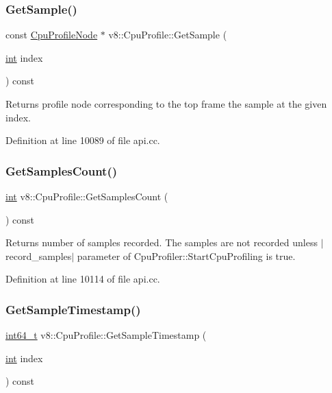 \subsubsection{\texorpdfstring{Get\+Sample()}{GetSample()}}
{\footnotesize\ttfamily const \mbox{\hyperlink{classv8_1_1CpuProfileNode}{Cpu\+Profile\+Node}} $\ast$ v8\+::\+Cpu\+Profile\+::\+Get\+Sample (\begin{DoxyParamCaption}\item[{\mbox{\hyperlink{classint}{int}}}]{index }\end{DoxyParamCaption}) const}

Returns profile node corresponding to the top frame the sample at the given index. 

Definition at line 10089 of file api.\+cc.

\mbox{\label{classv8_1_1CpuProfile_a26d1c490bd4e36090ed75706cbaf64fe}} 
\subsubsection{\texorpdfstring{Get\+Samples\+Count()}{GetSamplesCount()}}
{\footnotesize\ttfamily \mbox{\hyperlink{classint}{int}} v8\+::\+Cpu\+Profile\+::\+Get\+Samples\+Count (\begin{DoxyParamCaption}{ }\end{DoxyParamCaption}) const}

Returns number of samples recorded. The samples are not recorded unless $\vert$record\+\_\+samples$\vert$ parameter of Cpu\+Profiler\+::\+Start\+Cpu\+Profiling is true. 

Definition at line 10114 of file api.\+cc.

\mbox{\label{classv8_1_1CpuProfile_a7c243a327e65455f087c738c570ddae8}} 
\subsubsection{\texorpdfstring{Get\+Sample\+Timestamp()}{GetSampleTimestamp()}}
{\footnotesize\ttfamily \mbox{\hyperlink{classint64__t}{int64\+\_\+t}} v8\+::\+Cpu\+Profile\+::\+Get\+Sample\+Timestamp (\begin{DoxyParamCaption}\item[{\mbox{\hyperlink{classint}{int}}}]{index }\end{DoxyParamCaption}) const}

